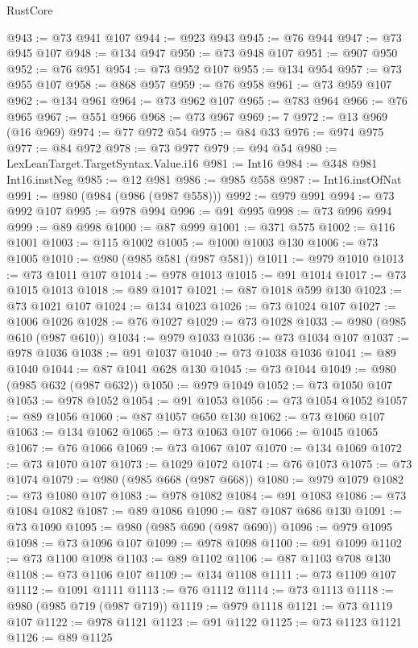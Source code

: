 \begin{lexlean}{RustCore}
\begin{coremodule}
@943 := @73 @941 @107
@944 := @923 @943
@945 := @76 @944
@947 := @73 @945 @107
@948 := @134 @947
@950 := @73 @948 @107
@951 := @907 @950
@952 := @76 @951
@954 := @73 @952 @107
@955 := @134 @954
@957 := @73 @955 @107
@958 := @868 @957
@959 := @76 @958
@961 := @73 @959 @107
@962 := @134 @961
@964 := @73 @962 @107
@965 := @783 @964
@966 := @76 @965
@967 := @551 @966
@968 := @73 @967
@969 := 7
@972 := @13 @969 (@16 @969)
@974 := @77 @972 @54
@975 := @84 @33
@976 := @974 @975
@977 := @84 @972
@978 := @73 @977
@979 := @94 @54
@980 := LexLeanTarget.TargetSyntax.Value.i16
@981 := Int16
@984 := @348 @981 Int16.instNeg
@985 := @12 @981
@986 := @985 @558
@987 := Int16.instOfNat
@991 := @980 (@984 (@986 (@987 @558)))
@992 := @979 @991
@994 := @73 @992 @107
@995 := @978 @994
@996 := @91 @995
@998 := @73 @996 @994
@999 := @89 @998
@1000 := @87 @999
@1001 := @371 @575
@1002 := @116 @1001
@1003 := @115 @1002
@1005 := @1000 @1003 @130
@1006 := @73 @1005
@1010 := @980 (@985 @581 (@987 @581))
@1011 := @979 @1010
@1013 := @73 @1011 @107
@1014 := @978 @1013
@1015 := @91 @1014
@1017 := @73 @1015 @1013
@1018 := @89 @1017
@1021 := @87 @1018 @599 @130
@1023 := @73 @1021 @107
@1024 := @134 @1023
@1026 := @73 @1024 @107
@1027 := @1006 @1026
@1028 := @76 @1027
@1029 := @73 @1028
@1033 := @980 (@985 @610 (@987 @610))
@1034 := @979 @1033
@1036 := @73 @1034 @107
@1037 := @978 @1036
@1038 := @91 @1037
@1040 := @73 @1038 @1036
@1041 := @89 @1040
@1044 := @87 @1041 @628 @130
@1045 := @73 @1044
@1049 := @980 (@985 @632 (@987 @632))
@1050 := @979 @1049
@1052 := @73 @1050 @107
@1053 := @978 @1052
@1054 := @91 @1053
@1056 := @73 @1054 @1052
@1057 := @89 @1056
@1060 := @87 @1057 @650 @130
@1062 := @73 @1060 @107
@1063 := @134 @1062
@1065 := @73 @1063 @107
@1066 := @1045 @1065
@1067 := @76 @1066
@1069 := @73 @1067 @107
@1070 := @134 @1069
@1072 := @73 @1070 @107
@1073 := @1029 @1072
@1074 := @76 @1073
@1075 := @73 @1074
@1079 := @980 (@985 @668 (@987 @668))
@1080 := @979 @1079
@1082 := @73 @1080 @107
@1083 := @978 @1082
@1084 := @91 @1083
@1086 := @73 @1084 @1082
@1087 := @89 @1086
@1090 := @87 @1087 @686 @130
@1091 := @73 @1090
@1095 := @980 (@985 @690 (@987 @690))
@1096 := @979 @1095
@1098 := @73 @1096 @107
@1099 := @978 @1098
@1100 := @91 @1099
@1102 := @73 @1100 @1098
@1103 := @89 @1102
@1106 := @87 @1103 @708 @130
@1108 := @73 @1106 @107
@1109 := @134 @1108
@1111 := @73 @1109 @107
@1112 := @1091 @1111
@1113 := @76 @1112
@1114 := @73 @1113
@1118 := @980 (@985 @719 (@987 @719))
@1119 := @979 @1118
@1121 := @73 @1119 @107
@1122 := @978 @1121
@1123 := @91 @1122
@1125 := @73 @1123 @1121
@1126 := @89 @1125

\end{coremodule}
\end{lexlean}
